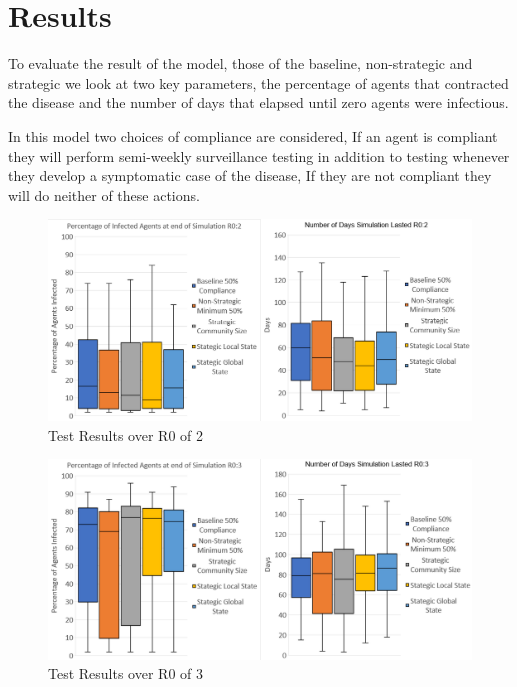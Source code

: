 \documentclass{article}
\begin{document}
\section{Results}

To evaluate the result of the model, those of the baseline, non-strategic and strategic we look at two key parameters, the percentage of agents that contracted the disease and the number of days that elapsed until zero agents were infectious.

In this model two choices of compliance are considered, If an agent is compliant they will perform semi-weekly surveillance testing in addition to testing whenever they develop a symptomatic case of the disease, If they are not compliant they will do neither of these actions.


\begin{figure}[h!]
\centering
\includegraphics[width=\textwidth]{5}
\caption{Test Results over R0 of 2}
\end{figure}

\newpage
\begin{figure}[h!]
\centering
\includegraphics[width=\textwidth]{4}
\caption{Test Results over R0 of 3}
\end{figure}
\end{document}
